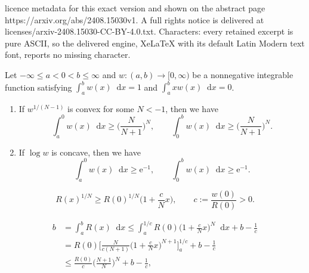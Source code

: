 \documentclass[10pt,a4paper]{amsart}
\newcommand*\diff{\mathop{}\!\mathrm{d}}
\newcommand{\e}{\mathrm{e}}
\newcommand{\lra}{\longrightarrow}
\begin{document}
licence metadata for this exact version and shown on the abstract page https://arxiv.org/abs/2408.15030v1. A full rights notice is delivered at licenses/arxiv-2408.15030-CC-BY-4.0.txt. Characters: every retained excerpt is pure ASCII, so the delivered engine, XeLaTeX with its default Latin Modern text font, reports no missing character.
\begin{lemma}[Gr\"unbaum's inequality on intervals; $N<-1$, $N=\infty$]\label{lm:1d_neg}
Let $-\infty \le a<0<b \le \infty$ and $w\colon (a,b) \lra [0,\infty)$ be a nonnegative integrable function satisfying
$\int_a^b w(x)\diff x=1$ and $\int_a^b xw(x)\diff x=0$.
\begin{enumerate}[{\rm (i)}]
\item\label{1d_neg}
If $w^{1/(N-1)}$ is convex for some $N<-1$, then we have
\begin{equation}\label{eq:1d_neg}
\int_a^0 w(x) \diff x \geq \biggl( \frac{N}{N+1} \biggr)^N, \qquad
\int_0^b w(x) \diff x \geq \biggl( \frac{N}{N+1} \biggr)^N.
\end{equation}
\item\label{1d_inf}
If $\log w$ is concave, then we have
\begin{equation}\label{eq:1d_inf}
\int_a^0 w(x) \diff x \geq \e^{-1}, \qquad
\int_0^b w(x) \diff x \geq \e^{-1}.
\end{equation}
\end{enumerate}
\end{lemma}

\begin{equation}\label{eq:H_neg}
R(x)^{1/N} \ge R(0)^{1/N} \biggl( 1+\frac{c}{N}x \biggr), \qquad
c:=\frac{w(0)}{R(0)}>0.
\end{equation}

\begin{align}
b &= \int _a^b R(x)\diff x
 \le  \int_a^{1/c} R(0)\biggl( 1+\frac{c}{N}x \biggr)^N \diff x +b-\frac{1}{c} \label{eq:b_neg}\\
&= R(0) \Biggl[ \frac{N}{c(N+1)} \biggl( 1+\frac{c}{N}x \biggr)^{N+1} \Biggr]_a^{1/c} +b-\frac{1}{c} \nonumber\\
&\le \frac{R(0)}{c} \biggl(\frac{N+1}{N}\biggr)^N +b-\frac{1}{c}, \nonumber
\end{align}
\end{document}
